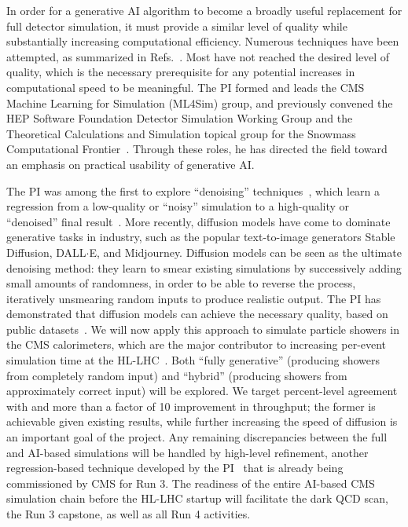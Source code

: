 In order for a generative AI algorithm to become a broadly useful replacement for full detector simulation,
it must provide a similar level of quality while substantially increasing computational efficiency.
Numerous techniques have been attempted, as summarized in Refs.~\cite{Adelmann:2022ozp,Hashemi:2023rgo}.
Most have not reached the desired level of quality, which is the necessary prerequisite for any potential increases in computational speed to be meaningful.
The PI formed and leads the CMS Machine Learning for Simulation (ML4Sim) group, and previously convened the HEP Software Foundation Detector Simulation Working Group
and the Theoretical Calculations and Simulation topical group for the Snowmass Computational Frontier~\cite{Boyle:2022cvo,Elvira:2022wyn}.
Through these roles, he has directed the field toward an emphasis on practical usability of generative AI.

The PI was among the first to explore ``denoising'' techniques~\cite{Banerjee:2022gkg}, which learn a regression from a low-quality or ``noisy'' simulation to a high-quality or ``denoised'' final result~\cite{Pixar}.
More recently, diffusion models have come to dominate generative tasks in industry, such as the popular text-to-image generators Stable Diffusion, DALL${\cdot}$E, and Midjourney.
Diffusion models can be seen as the ultimate denoising method: they learn to smear existing simulations by successively adding small amounts of randomness,
in order to be able to reverse the process, iteratively unsmearing random inputs to produce realistic output.
The PI has demonstrated that diffusion models can achieve the necessary quality, based on public datasets~\cite{Amram:2023onf}.
We will now apply this approach to simulate particle showers in the CMS calorimeters, which are the major contributor to increasing per-event simulation time at the HL-LHC~\cite{Pedro:2020kbk}.
Both ``fully generative'' (producing showers from completely random input) and ``hybrid'' (producing showers from approximately correct input) will be explored.
We target percent-level agreement with \GEANTfour and more than a factor of 10 improvement in throughput;
the former is achievable given existing results, while further increasing the speed of diffusion is an important goal of the project.
Any remaining discrepancies between the full and AI-based simulations will be handled by high-level refinement,
another regression-based technique developed by the PI~\cite{Bein:2023ylt} that is already being commissioned by CMS for Run 3.
The readiness of the entire AI-based CMS simulation chain before the HL-LHC startup will facilitate the dark QCD scan, the Run 3 capstone, as well as all Run 4 activities.

